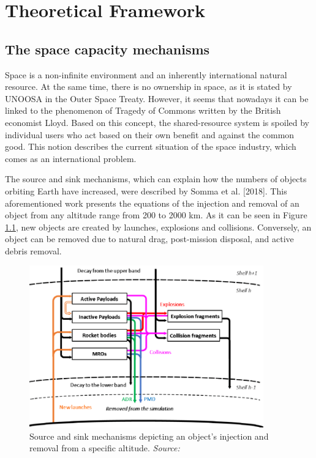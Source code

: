 \chapter{Theoretical Framework}
\label{chap:2}

\section{The space capacity mechanisms}
\bigskip

Space is a non-infinite environment and an inherently %
international natural resource. At the same time, there is no ownership in space, as it is stated by UNOOSA in the Outer Space Treaty. However, it seems that nowadays it can be linked to the phenomenon of Tragedy of Commons written by the British economist Lloyd. Based on this concept, the shared-resource system is spoiled by individual users who act based on their own benefit and against the common good. This notion describes the current situation of the space industry, which comes as an international problem.

\bigskip
The source and sink mechanisms, which can explain how the numbers of objects orbiting Earth have increased, were described by Somma et al. [2018]. This aforementioned work \cite{Somma 2019} presents the equations of the injection and removal of an object from any altitude range from 200 to 2000 km. As it can be seen in Figure \ref{mechanism}, new objects are created by launches, explosions and collisions. Conversely, an object can be removed due to natural drag, post-mission disposal, and active debris removal.

\begin{figure}
\centering
\includegraphics[width=0.9\textwidth]{Images/mechanism.png}\caption{Source and sink mechanisms depicting an object's injection and removal from a specific altitude. \textit{Source: \cite{Somma 2019}}}
\label{mechanism} 
\end{figure}

